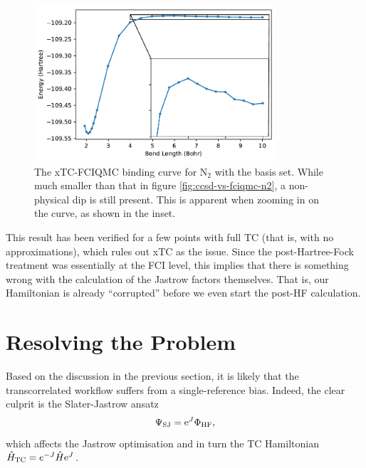 \begin{figure}[htbp]
    \centering
    \includegraphics[width=0.8\textwidth]{figures/binding/inset_nontcfciqmc}
    \caption{The xTC-FCIQMC binding curve for N$_2$ with the \avtz basis set. While much smaller than that in figure \ref{fig:ccsd-vs-fciqmc-n2}, a non-physical dip is still present. This is apparent when zooming in on the curve, as shown in the inset.}
    \label{fig:binding-dip}
\end{figure}

This result has been verified for a few points with full TC (that is, with no approximations), which rules out xTC as the issue. Since the post-Hartree-Fock treatment was essentially at the FCI level, this implies that there is something wrong with the calculation of the Jastrow factors themselves. That is, our Hamiltonian is already ``corrupted'' before we even start the post-HF calculation.


\section{Resolving the Problem}

Based on the discussion in the previous section, it is likely that the transcorrelated workflow suffers from a single-reference bias. Indeed, the clear culprit is the Slater-Jastrow ansatz
\begin{equation}
    \label{eq:slater-jastrow}
    \Psi_\mathrm{SJ} = \mathrm{e}^J\Phi_\mathrm{HF},
\end{equation}
which affects the Jastrow optimisation and in turn the TC Hamiltonian $\hat H_\mathrm{TC} = e^{-J}\hat H\mathrm{e}^J$.


